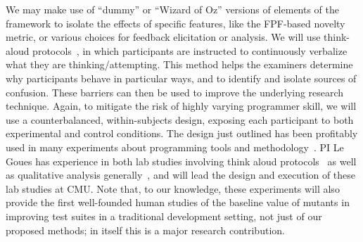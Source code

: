 We may make use of ``dummy'' or ``Wizard of Oz'' versions of elements of the
framework to isolate the effects of specific features, like the FPF-based
novelty metric, or various choices for feedback elicitation or analysis.
We will use
think-aloud protocols~\cite{thinkaloud}, in which participants are instructed to
continuously verbalize what they are thinking/attempting. This method helps the
examiners determine why participants behave in particular ways, and to identify
and isolate sources of confusion.  These barriers can then be used to improve
the underlying research technique.  Again, to mitigate the risk of highly varying
programmer skill, we will use a counterbalanced, within-subjects design,
exposing each participant to both experimental and control conditions.  The
design just outlined has been profitably used in many
experiments about programming tools and
methodology~\cite{Endrikat2014,Stylos07}.  PI Le Goues has experience in both
lab studies involving think aloud protocols~\cite{frameworkDebugging} as well as
qualitative analysis generally~\cite{testingUnderReview}, and will lead the
design and execution of these lab studies at CMU.  Note that, to our
knowledge, these experiments will also provide the first well-founded
human studies of the baseline value of mutants in improving test
suites in a traditional development setting, not
just of our proposed methods; in itself this is a major research contribution.

